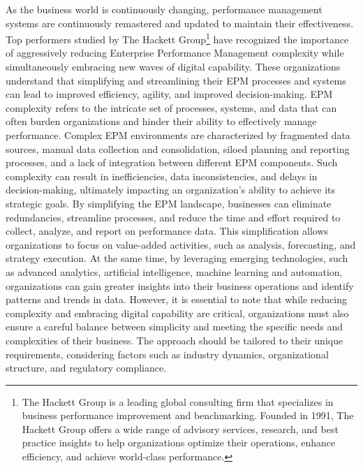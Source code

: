 \documentclass[12pt,a4paper,openright,twoside]{book}
\begin{document}
As the business world is continuously changing, performance management systems are continuously remastered and updated to maintain their effectiveness.
%
Top performers studied by The Hackett Group\footnote{The Hackett Group is a leading global consulting firm that specializes in business performance improvement and benchmarking. Founded in 1991, The Hackett Group offers a wide range of advisory services, research, and best practice insights to help organizations optimize their operations, enhance efficiency, and achieve world-class performance.} have recognized the importance of aggressively reducing Enterprise Performance Management complexity while simultaneously embracing new waves of digital capability.
%
These organizations understand that simplifying and streamlining their EPM processes and systems can lead to improved efficiency, agility, and improved decision-making. \cite{balog2017best}
%
EPM complexity refers to the intricate set of processes, systems, and data that can often burden organizations and hinder their ability to effectively manage performance. 
%
Complex EPM environments are characterized by fragmented data sources, manual data collection and consolidation, siloed planning and reporting processes, and a lack of integration between different EPM components. 
%
Such complexity can result in inefficiencies, data inconsistencies, and delays in decision-making, ultimately impacting an organization's ability to achieve its strategic goals.
%
By simplifying the EPM landscape, businesses can eliminate redundancies, streamline processes, and reduce the time and effort required to collect, analyze, and report on performance data. 
%
This simplification allows organizations to focus on value-added activities, such as analysis, forecasting, and strategy execution.
%
At the same time, by leveraging emerging technologies, such as advanced analytics, artificial intelligence, machine learning and automation, organizations can gain greater insights into their business operations and identify patterns and trends in data.
%
However, it is essential to note that while reducing complexity and embracing digital capability are critical, organizations must also ensure a careful balance between simplicity and meeting the specific needs and complexities of their business. The approach should be tailored to their unique requirements, considering factors such as industry dynamics, organizational structure, and regulatory compliance.
\end{document}
